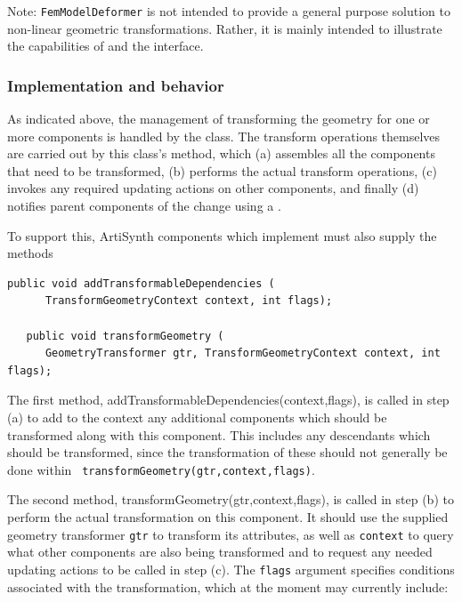 \begin{sideblock}
Note: {\tt FemModelDeformer} is not intended to provide a general
purpose solution to non-linear geometric transformations. Rather, it
is mainly intended to illustrate the capabilities of
 and the
 interface.
\end{sideblock}

\subsubsection{Implementation and behavior}

As indicated above, the management of transforming the geometry for one
or more components is handled by the
 class.
The transform operations themselves are carried out by this class's
method, which (a) assembles all the components that need
to be transformed, (b) performs the actual transform operations,
(c) invokes any required updating actions on other components,
and finally (d) notifies parent components of the change using
a .

To support this, ArtiSynth components which implement
must also supply the methods
%
\begin{lstlisting}[]
   public void addTransformableDependencies (
      TransformGeometryContext context, int flags);

   public void transformGeometry (
      GeometryTransformer gtr, TransformGeometryContext context, int flags);
\end{lstlisting}
%
The first method,
%
{addTransformableDependencies(context,flags)}, 
is called in step (a) to add to the context any additional components
which should be transformed along with this component. This includes
any descendants which should be transformed, since the
transformation of these should not generally be done within {\tt
transformGeometry(gtr,context,flags)}.

The second method, 
%
{transformGeometry(gtr,context,flags)}, is
called in step (b) to perform the actual transformation on this
component.  It should use the supplied geometry transformer {\tt gtr}
to transform its attributes, as well as {\tt context} to query what
other components are also being transformed and to request
any needed updating actions to be called in step (c).  The {\tt flags} argument
specifies conditions associated with the transformation, which at the
moment may currently include:

